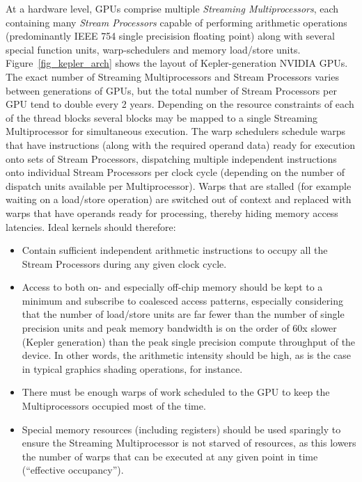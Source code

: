At a hardware level, GPUs comprise multiple \textit{Streaming Multiprocessors}, each containing many \textit{Stream Processors} capable of performing arithmetic operations (predominantly IEEE 754 single precisision floating point) along
with several special function units, warp-schedulers and memory load/store units. Figure~\ref{fig_kepler_arch} shows the layout of Kepler-generation NVIDIA GPUs. The exact number of Streaming Multiprocessors and Stream Processors
varies between generations of GPUs, but the total number of Stream Processors per GPU tend to double every 2 years. Depending on the resource constraints of each of the thread blocks several blocks may be mapped to a single 
Streaming Multiprocessor for simultaneous execution. The warp schedulers schedule warps that have instructions (along with the required operand data) ready for execution onto sets of Stream Processors, dispatching multiple independent 
instructions onto individual Stream Processors per clock cycle (depending on the number of dispatch units available per Multiprocessor). Warps that are stalled (for example waiting on a load/store operation) are switched out of context
and replaced with warps that have operands ready for processing, thereby hiding memory access latencies. Ideal kernels should therefore:
\begin{itemize}
 \item Contain sufficient independent arithmetic instructions to occupy all the Stream Processors during
       any given clock cycle.
 \item Access to both on- and especially off-chip memory should be kept to a minimum and subscribe to coalesced access patterns, especially considering that the number of load/store units are far fewer than the number of
       single precision units and peak memory bandwidth is on the order of 60x slower (Kepler generation) than the peak single precision compute throughput of the device. In other words, the arithmetic intensity should be high, as
       is the case in typical graphics shading operations, for instance.
 \item There must be enough warps of work scheduled to the GPU to keep the Multiprocessors occupied most of the time.
 \item Special memory resources (including registers) should be used sparingly to ensure the Streaming Multiprocessor is not starved of resources, as this lowers the number of warps that can be executed at any given point in time 
      (``effective occupancy'').
\end{itemize}
